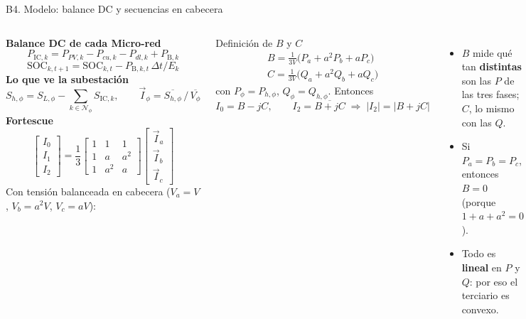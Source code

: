 \documentclass[aspectratio=169,10pt,t]{beamer}
\newcommand{\Pic}[1]{P_{\mathrm{IC},#1}}
\newcommand{\PB}[1]{P_{\mathrm{B},#1}}
\newcommand{\SOC}[1]{\mathrm{SOC}_{#1}}
\newcommand{\Nset}[1]{\mathcal{N}_{#1}}
\begin{document}
\begin{frame}{B4. Modelo: balance DC y secuencias en cabecera}
  \begin{columns}[T,onlytextwidth]
    \footnotesize
    \textbf{\color{usachT}Balance DC de cada Micro-red}
    \[\Pic{k}=P_{PV,k}-P_{cu,k}-P_{dl,k}+\PB{k}\]
    \[\SOC{k,t+1}=\SOC{k,t}-\PB{k,t}\,\Delta t/E_k\]
    \textbf{\color{usachT}Lo que ve la subestación}
    \[S_{h,\phi}=S_{L,\phi}-\textstyle\sum_{k\in\Nset{\phi}}S_{\mathrm{IC},k},\qquad \vec I_\phi=\overline{S_{h,\phi}}\,/\,\overline{V_\phi}\]
    \textbf{\color{usachT}Fortescue}
    \[\begin{bmatrix}I_0\\I_1\\I_2\end{bmatrix}=\frac13\begin{bmatrix}1&1&1\\1&a&a^2\\1&a^2&a\end{bmatrix}\begin{bmatrix}\vec I_a\\\vec I_b\\\vec I_c\end{bmatrix}\]
    \footnotesize
    Con tensión balanceada en cabecera ($V_a=V$, $V_b=a^2V$, $V_c=aV$):
    \begin{block}{Definición de $B$ y $C$}
      \footnotesize
      \vspace{-4pt}
      \begin{gather*} B=\tfrac{1}{3V}\big(P_a+a^2P_b+aP_c\big)\\ C=\tfrac{1}{3V}\big(Q_a+a^2Q_b+aQ_c\big)\end{gather*}
      con $P_\phi=P_{h,\phi}$, $Q_\phi=Q_{h,\phi}$. Entonces
      \[ I_0=B-jC,\qquad I_2=\overline{B+jC}\;\Rightarrow\;|I_2|=|B+jC| \]
    \end{block}
    \begin{itemize}\setlength\itemsep{2pt}
      \item $B$ mide qué tan \textbf{distintas} son las $P$ de las tres fases; $C$, lo mismo con las $Q$.
      \item Si $P_a=P_b=P_c$, entonces $B=0$ (porque $1+a+a^2=0$).
      \item Todo es \textbf{lineal} en $P$ y $Q$: por eso el terciario es convexo.
    \end{itemize}
  \end{columns}
\end{frame}
\end{document}
